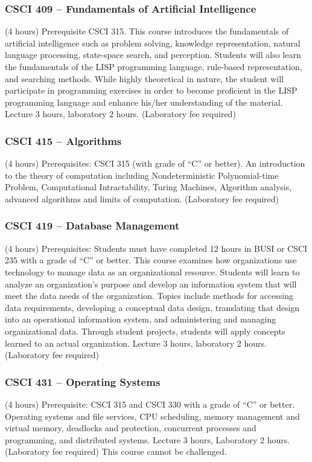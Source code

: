 \subsubsection{CSCI 409 -- Fundamentals of Artificial Intelligence}
(4 hours) Prerequisite CSCI 315. This course introduces the fundamentals of artificial intelligence such as problem solving, knowledge representation, natural language processing, state-space search, and perception. Students will also learn the fundamentals of the LISP programming language, rule-based representation, and searching methods. While highly theoretical in nature, the student will participate in programming exercises in order to become proficient in the LISP programming language and enhance his/her understanding of the material. Lecture 3 hours, laboratory 2 hours. (Laboratory fee required)

\subsubsection{CSCI 415 -- Algorithms}
(4 hours) Prerequisites: CSCI 315 (with grade of “C” or better). An introduction to the theory of computation including Nondeterministic Polynomial-time Problem, Computational Intractability, Turing Machines, Algorithm analysis, advanced algorithms and limits of computation. (Laboratory fee required)

\subsubsection{CSCI 419 -- Database Management}
(4 hours) Prerequisites: Students must have completed 12 hours in BUSI or CSCI 235 with a grade of “C” or better. This course examines how organizations use technology to manage data as an organizational resource. Students will learn to analyze an organization’s purpose and develop an information system that will meet the data needs of the organization. Topics include methods for accessing data requirements, developing a conceptual data design, translating that design into an operational information system, and administering and managing organizational data. Through student projects, students will apply concepts learned to an actual organization. Lecture 3 hours, laboratory 2 hours. (Laboratory fee required)

\subsubsection{CSCI 431 -- Operating Systems}
(4 hours) Prerequisite: CSCI 315 and CSCI 330 with a grade of “C” or better. Operating systems and file services, CPU scheduling, memory management and virtual memory, deadlocks and protection, concurrent processes and programming, and distributed systems. Lecture 3 hours, Laboratory 2 hours. (Laboratory fee required) This course cannot be challenged.

